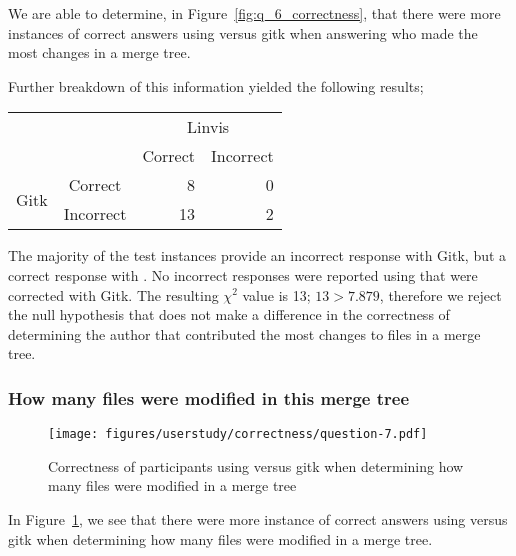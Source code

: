 We are able to determine, in Figure~\ref{fig:q_6_correctness}, that
there were more instances of correct answers using \tool versus gitk
when answering who made the most changes in a merge tree.

Further breakdown of this information yielded the following results;



\begin{center}
  \begin{tabular}{cc|rr}
                           &           & \multicolumn{2}{c}{Linvis}\\
                           &           & Correct                      & Incorrect\\\hline
    \multirow{2}{*}{Gitk}  & Correct   & 8                            & 0\\
                           & Incorrect & 13                           & 2\\
  \end{tabular}
\end{center}

The majority of the test instances provide an incorrect response with
Gitk, but a correct response with \tool. No incorrect responses were
reported using \tool that were corrected with Gitk. The resulting
$\chi^2$ value is 13; $13 > 7.879$, therefore we reject the null
hypothesis that \tool does not make a difference in the correctness of
determining the author that contributed the most changes to files in a
merge tree.

\subsubsection{How many files were modified in this merge tree}
\label{ssub:how_many_files_were_modified_in_this_merge_tree}

\begin{figure}[htpb]
  \centering
  \texttt{[image: figures/userstudy/correctness/question-7.pdf]}
  \caption{Correctness of participants using \tool versus gitk when
    determining how many files were modified in a merge tree}
  \label{fig:q_7_correctness}
\end{figure}

In Figure~\ref{fig:q_7_correctness}, we see that there were more
instance of correct answers using \tool versus gitk when determining how
many files were modified in a merge tree.

